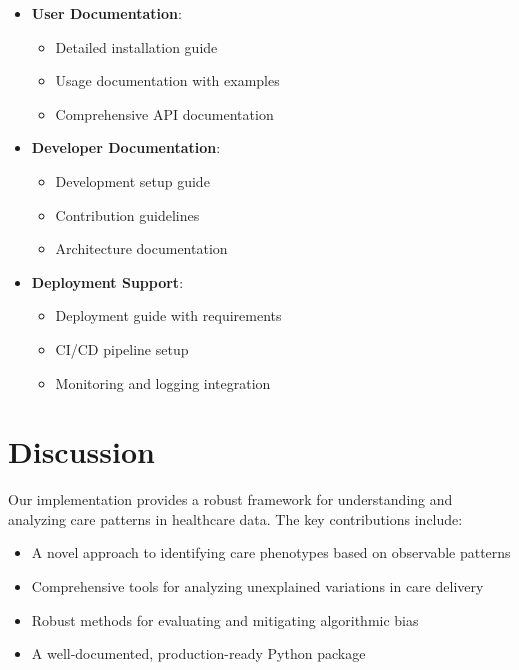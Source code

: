 \documentclass[12pt]{article}
\begin{document}
\begin{itemize}
    \item \textbf{User Documentation}:
    \begin{itemize}
        \item Detailed installation guide
        \item Usage documentation with examples
        \item Comprehensive API documentation
    \end{itemize}
    
    \item \textbf{Developer Documentation}:
    \begin{itemize}
        \item Development setup guide
        \item Contribution guidelines
        \item Architecture documentation
    \end{itemize}
    
    \item \textbf{Deployment Support}:
    \begin{itemize}
        \item Deployment guide with requirements
        \item CI/CD pipeline setup
        \item Monitoring and logging integration
    \end{itemize}
\end{itemize}

\section{Discussion}

Our implementation provides a robust framework for understanding and analyzing care patterns in healthcare data. The key contributions include:

\begin{itemize}
    \item A novel approach to identifying care phenotypes based on observable patterns
    \item Comprehensive tools for analyzing unexplained variations in care delivery
    \item Robust methods for evaluating and mitigating algorithmic bias
    \item A well-documented, production-ready Python package
\end{itemize}
\end{document}
